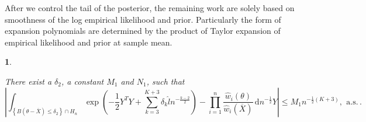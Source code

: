 \documentclass[oneside,english]{amsbook}
\numberwithin{section}{chapter}
\numberwithin{equation}{section}
\numberwithin{figure}{section}
\theoremstyle{plain}
\newtheorem{lem}{\protect\lemmaname}
\theoremstyle{plain}
\theoremstyle{definition}
\theoremstyle{plain}
\theoremstyle{plain}
\theoremstyle{remark}
\theoremstyle{definition}
\theoremstyle{definition}
\newcommand{\diff}{\,\mathrm{d}}
\newcommand{\ascv}{\,\mathrm{a.s.}\,}
\providecommand{\lemmaname}{Lemma}
\begin{document}
After we control the tail of the posterior, the remaining work are
solely based on smoothness of the log empirical likelihood and prior.
Particularly the form of expansion polynomials are determined by the
product of Taylor expansion of empirical likelihood and prior at sample
mean. 
\begin{lem}
\label{lem:central-expansion-llik}%

There exist a $\delta_{2}$, a constant $M_{1}$ and $N_{1}$, such
that 
\[
\left|\int_{\left\{ B\left(\theta-\overline{X}\right)\le\delta_{2}\right\} \cap H_{n}}\exp\left(-\frac{1}{2}Y^{T}Y+\sum_{k=3}^{K+3}\delta_{k}\hat{l}n^{-\frac{k-2}{2}}\right)-\prod_{i=1}^{n}\frac{\hat{w}_{i}\left(\theta\right)}{\hat{w}_{i}\left(\overline{X}\right)}\diff n^{-\frac{1}{2}}Y\right|\le M_{1}n^{-\frac{1}{2}\left(K+3\right)},\:\ascv.
\]
\end{lem}
\end{document}
